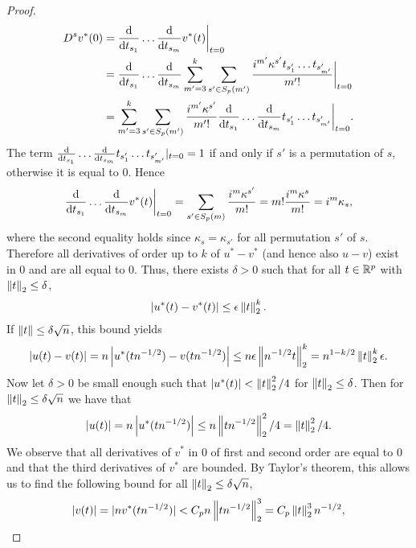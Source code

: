 \begin{proof}
    \begin{align*}
        D^s v^*(0)
        &= \frac{\text{d}}{\text{d} t_{s_1}}\ldots\frac{\text{d}}{\text{d} t_{s_m}} v^*(t) \bigg|_{t=0}\\
        &= \frac{\text{d}}{\text{d} t_{s_1}}\ldots\frac{\text{d}}{\text{d} t_{s_m}} \sum_{m'=3}^k \sum_{s' \in S_p(m')} \frac{i^{m'}\kappa^{s'}t_{s'_1}\ldots t_{s'_{m'}}}{m'!} \bigg|_{t=0} \\
        &= \sum_{m'=3}^k \sum_{s' \in S_p(m')} \frac{i^{m'}\kappa^{s'}}{m'!} \frac{\text{d}}{\text{d} t_{s_1}}\ldots\frac{\text{d}}{\text{d} t_{s_m}}t_{s'_1}\ldots t_{s'_{m'}} \bigg|_{t=0}.
    \end{align*}
    The term $\frac{\text{d}}{\text{d} t_{s_1}}\ldots\frac{\text{d}}{\text{d} t_{s_m}}t_{s'_1}\ldots t_{s'_{m'}} |_{t=0} = 1$ if and only if $s'$ is a permutation of $s$, otherwise it is equal to 0. Hence
    \begin{equation*}
        \frac{\text{d}}{\text{d} t_{s_1}}\ldots\frac{\text{d}}{\text{d} t_{s_m}} v^*(t) \bigg|_{t=0} 
        = \sum_{s' \in S_p(m)} \frac{i^m\kappa^{s'}}{m!}
        = m! \frac{i^m\kappa^{s}}{m!}
        = i^m\kappa_s,
    \end{equation*}
    where the second equality holds since $\kappa_s = \kappa_{s'}$ for all permutation $s'$ of $s$. Therefore all derivatives of order up to $k$ of $u^* - v^*$ (and hence also $u - v$) exist in 0 and are all equal to 0. Thus, there exists $\delta > 0$ such that for all $t \in {\mathbb{R}^p}$ with $\left\lVert t\right\rVert_2 \leq \delta$,
    \begin{equation*}
        \left|u^*(t) - v^*(t)\right| \leq \epsilon\left\lVert t\right\rVert_2^k.
    \end{equation*}
    If $\left\lVert t\right\rVert \leq \delta \sqrt{n}$, this bound yields
    \begin{equation*}
        \left|u(t) - v(t)\right| = n\left|u^*(t n^{-1/2}) - v(t n^{-1/2})\right| \leq n\epsilon\left\lVert n^{-1/2}t\right\rVert_2^k = n^{1-k/2}\left\lVert t\right\rVert_2^k\epsilon.
    \end{equation*}
    Now let $\delta > 0$ be small enough such that $\left|u^*(t)\right| < \left\lVert t\right\rVert_2^2/4$ for $\left\lVert t\right\rVert_2 \leq \delta$. Then for $\left\lVert t\right\rVert_2 \leq \delta\sqrt{n}$ we have that
    \begin{equation*}
        \left|u(t)\right| = n\left|u^*(t n^{-1/2})\right| \leq n \left\lVert t n^{-1/2}\right\rVert_2^2/4 = \left\lVert t\right\rVert_2^2/4.
    \end{equation*}
    We observe that all derivatives of $v^*$ in 0 of first and second order are equal to 0 and that the third derivatives of $v^*$ are bounded. By Taylor's theorem, this allows us to find the following bound for all $\left\lVert t\right\rVert_2 \leq \delta \sqrt{n}$,
    \begin{equation*}
        |v(t)| = |nv^*(t n^{-1/2})| < C_p n \norm{t n^{-1/2}}_2^3 = C_p \norm{t}_2^3 n^{-1/2},

\end{equation*}
\end{proof}
